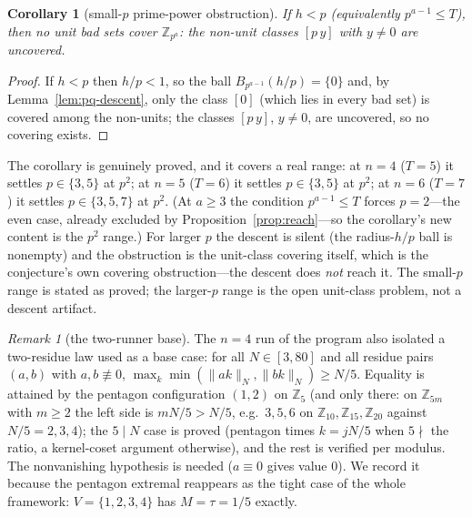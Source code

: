 \documentclass[11pt,a4paper]{article}
\numberwithin{equation}{section}
\theoremstyle{plain}
\theoremstyle{plain}
\newtheorem{corollary}[theorem]{Corollary}
\theoremstyle{definition}
\theoremstyle{remark}
\newtheorem{remark}[theorem]{Remark}
\newcommand{\Z}{\mathbb{Z}}
\newcommand{\wn}[1]{\lVert #1 \rVert_{N}}
\begin{document}
\begin{corollary}[small-$p$ prime-power obstruction]\label{cor:pq-small}
If $h<p$ (equivalently $p^{a-1}\le T$), then no unit bad sets cover
$\Z_{p^a}$: the non-unit classes $[p\,y]$ with $y\ne 0$ are uncovered.
\end{corollary}

\begin{proof}
If $h<p$ then $h/p<1$, so the ball $B_{p^{a-1}}(h/p)=\{0\}$ and, by
Lemma~\ref{lem:pq-descent}, only the class $[0]$ (which lies in every
bad set) is covered among the non-units; the classes $[p\,y]$, $y\ne0$,
are uncovered, so no covering exists.
\end{proof}

The corollary is genuinely proved, and it covers a real range: at
$n=4$ ($T=5$) it settles $p\in\{3,5\}$ at $p^2$; at $n=5$ ($T=6$) it
settles $p\in\{3,5\}$ at $p^2$; at $n=6$ ($T=7$) it settles
$p\in\{3,5,7\}$ at $p^2$. (At $a\ge3$ the condition $p^{a-1}\le T$ forces
$p=2$---the even case, already excluded by Proposition~\ref{prop:reach}---so
the corollary's new content is the $p^2$ range.) For larger $p$ the
descent is silent (the radius-$h/p$ ball is nonempty) and the obstruction
is the unit-class covering itself, which is the conjecture's own covering
obstruction---the descent does \emph{not} reach it. The small-$p$ range is
stated as proved; the larger-$p$ range is the open unit-class problem,
not a descent artifact.

\begin{remark}[the two-runner base]\label{rem:tworunner}
The $n=4$ run of the program also isolated a two-residue law used as a
base case: for all $N\in[3,80]$ and all residue pairs $(a,b)$ with
$a,b\not\equiv 0$,
$\max_k\min(\wn{ak},\wn{bk})\ge N/5$. Equality is attained by the
pentagon configuration $(1,2)$ on $\Z_5$ (and only there: on $\Z_{5m}$
with $m\ge 2$ the left side is $mN/5>N/5$, e.g.\ $3,5,6$ on
$\Z_{10},\Z_{15},\Z_{20}$ against $N/5=2,3,4$); the $5\mid N$ case is
proved (pentagon times $k=jN/5$ when $5\nmid$ the ratio, a kernel-coset
argument otherwise), and the rest is verified per modulus. The
nonvanishing hypothesis is needed ($a\equiv 0$ gives value $0$). We
record it because the pentagon extremal reappears as the tight case of
the whole framework: $V=\{1,2,3,4\}$ has $M=\tau=1/5$ exactly.
\end{remark}

\end{document}
